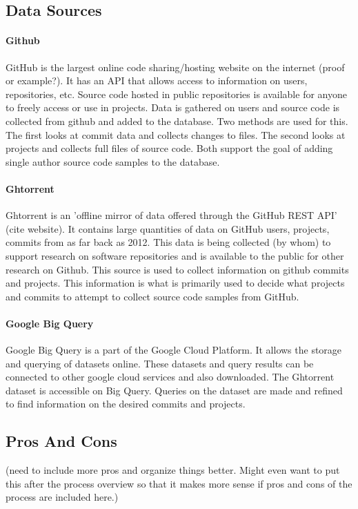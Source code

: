 \documentclass{article}
\begin{document}
\subsection{Data Sources}
\paragraph{Github}
GitHub is the largest online code sharing/hosting website on the internet (proof or example?). It has an API that allows access to information on users, repositories, etc. Source code hosted in public repositories is available for anyone to freely access or use in projects. Data is gathered on users and source code is collected from github and added to the database. Two methods are used for this. The first looks at commit data and collects changes to files. The second looks at projects and collects full files of source code. Both support the goal of adding single author source code samples to the database.

\paragraph{Ghtorrent}
Ghtorrent is an 'offline mirror of data offered through the GitHub REST API' (cite website). It contains large quantities of data on GitHub users, projects, commits from as far back as 2012. This data is being collected (by whom) to support research on software repositories and is available to the public for other research on Github. This source is used to collect information on github commits and projects. This information is what is primarily used to decide what projects and commits to attempt to collect source code samples from GitHub.

\paragraph{Google Big Query}
Google Big Query is a part of the Google Cloud Platform. It allows the storage and querying of datasets online. These datasets and query results can be connected to other google cloud services and also downloaded. The Ghtorrent dataset is accessible on Big Query. Queries on the dataset are made and refined to find information on the desired commits and projects.


\subsection{Pros And Cons}
(need to include more pros and organize things better. Might even want to put this after the process overview so that it makes more sense if pros and cons of the process are included here.)
\end{document}
